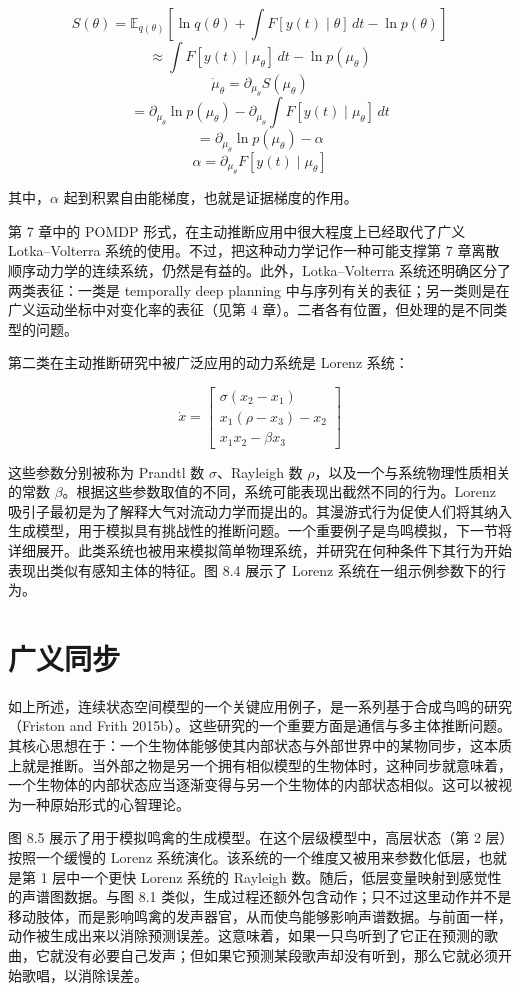 \[
S(\theta) = \mathbb{E}_{q(\theta)}\!\left[\ln q(\theta) + \int F[y(t)\mid \theta]\, dt - \ln p(\theta)\right]
\]
\[
\approx \int F[y(t)\mid \mu_\theta]\, dt - \ln p(\mu_\theta)
\]
\[
\dot{\mu}_\theta = \partial_{\mu_\theta} S(\mu_\theta)
\]
\[
= \partial_{\mu_\theta}\ln p(\mu_\theta) - \partial_{\mu_\theta}\int F[y(t)\mid \mu_\theta]\, dt
\]
\[
= \partial_{\mu_\theta}\ln p(\mu_\theta) - \alpha
\]
\[
\alpha = \partial_{\mu_\theta} F[y(t)\mid \mu_\theta]
\]

其中，$\alpha$ 起到积累自由能梯度，也就是证据梯度的作用。

第 7 章中的 POMDP 形式，在主动推断应用中很大程度上已经取代了广义 Lotka--Volterra 系统的使用。不过，把这种动力学记作一种可能支撑第 7 章离散顺序动力学的连续系统，仍然是有益的。此外，Lotka--Volterra 系统还明确区分了两类表征：一类是 temporally deep planning 中与序列有关的表征；另一类则是在广义运动坐标中对变化率的表征（见第 4 章）。二者各有位置，但处理的是不同类型的问题。

第二类在主动推断研究中被广泛应用的动力系统是 Lorenz 系统：

\[
\dot{x} =
\begin{bmatrix}
\sigma(x_2 - x_1) \\
x_1(\rho - x_3) - x_2 \\
x_1x_2 - \beta x_3
\end{bmatrix}
\tag{8.7}
\]

这些参数分别被称为 Prandtl 数 $\sigma$、Rayleigh 数 $\rho$，以及一个与系统物理性质相关的常数 $\beta$。根据这些参数取值的不同，系统可能表现出截然不同的行为。Lorenz 吸引子最初是为了解释大气对流动力学而提出的。其漫游式行为促使人们将其纳入生成模型，用于模拟具有挑战性的推断问题。一个重要例子是鸟鸣模拟，下一节将详细展开。此类系统也被用来模拟简单物理系统，并研究在何种条件下其行为开始表现出类似有感知主体的特征。图 8.4 展示了 Lorenz 系统在一组示例参数下的行为。

\section{广义同步}

如上所述，连续状态空间模型的一个关键应用例子，是一系列基于合成鸟鸣的研究（Friston and Frith 2015b）。这些研究的一个重要方面是通信与多主体推断问题。其核心思想在于：一个生物体能够使其内部状态与外部世界中的某物同步，这本质上就是推断。当外部之物是另一个拥有相似模型的生物体时，这种同步就意味着，一个生物体的内部状态应当逐渐变得与另一个生物体的内部状态相似。这可以被视为一种原始形式的心智理论。

图 8.5 展示了用于模拟鸣禽的生成模型。在这个层级模型中，高层状态（第 2 层）按照一个缓慢的 Lorenz 系统演化。该系统的一个维度又被用来参数化低层，也就是第 1 层中一个更快 Lorenz 系统的 Rayleigh 数。随后，低层变量映射到感觉性的声谱图数据。与图 8.1 类似，生成过程还额外包含动作；只不过这里动作并不是移动肢体，而是影响鸣禽的发声器官，从而使鸟能够影响声谱数据。与前面一样，动作被生成出来以消除预测误差。这意味着，如果一只鸟听到了它正在预测的歌曲，它就没有必要自己发声；但如果它预测某段歌声却没有听到，那么它就必须开始歌唱，以消除误差。

